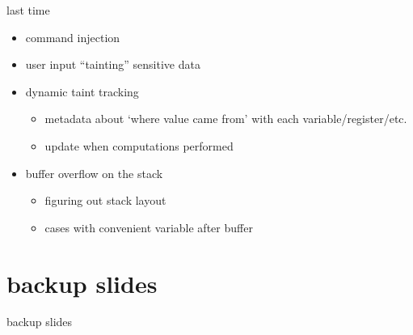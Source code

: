 \date{}
\title{}
\date{}

\begin{frame}
    \titlepage
\end{frame}



\begin{frame}{last time}
    \begin{itemize}
    \item command injection
    \item user input ``tainting'' sensitive data
    \item dynamic taint tracking
        \begin{itemize}
        \item metadata about `where value came from' with each variable/register/etc.
        \item update when computations performed
        \end{itemize}
    \item buffer overflow on the stack
        \begin{itemize}
        \item figuring out stack layout
        \item cases with convenient variable after buffer
        \end{itemize}
    \end{itemize}
\end{frame}







\section{backup slides}
\begin{frame}{backup slides}
\end{frame}






